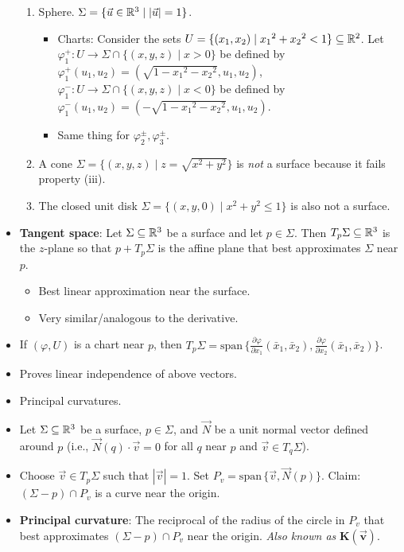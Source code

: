 \documentclass[../apprentice.tex]{subfiles}
\begin{document}
\begin{itemize}
\begin{enumerate}[label={\Alph*)}]
        \item Sphere. $\Sigma=\{\vec{u}\in\mathbb{R}^3\mid|\vec{u}|=1\}$.
        \begin{itemize}
            \item Charts: Consider the sets $U=\{(x_1,x_2)\mid {x_1}^2+{x_2}^2<1\}\subseteq\mathbb{R}^2$. Let $\varphi_1^+:U\to\Sigma\cap\{(x,y,z)\mid x>0\}$ be defined by $\varphi_1^+(u_1,u_2)=(\sqrt{1-{x_1}^2-{x_2}^2},u_1,u_2)$, $\varphi_1^-:U\to\Sigma\cap\{(x,y,z)\mid x<0\}$ be defined by $\varphi_1^-(u_1,u_2)=(-\sqrt{1-{x_1}^2-{x_2}^2},u_1,u_2)$.
            \item Same thing for $\varphi_2^\pm,\varphi_3^\pm$.
        \end{itemize}
        \item A cone $\Sigma=\{(x,y,z)\mid z=\sqrt{x^2+y^2}\}$ is \emph{not} a surface because it fails property (iii).
        \item The closed unit disk $\Sigma=\{(x,y,0)\mid x^2+y^2\leq 1\}$ is also not a surface.
    \end{enumerate}
    \item \textbf{Tangent space}: Let $\Sigma\subseteq\mathbb{R}^3$ be a surface and let $p\in\Sigma$. Then $T_p\Sigma\subseteq\mathbb{R}^3$ is the $z$-plane so that $p+T_p\Sigma$ is the affine plane that best approximates $\Sigma$ near $p$.
    \begin{itemize}
        \item Best linear approximation near the surface.
        \item Very similar/analogous to the derivative.
    \end{itemize}
    \item If $(\varphi,U)$ is a chart near $p$, then $T_p\Sigma=\text{span}\,\{\frac{\partial\varphi}{\partial x_1}(\bar{x}_1,\bar{x}_2),\frac{\partial\varphi}{\partial x_2}(\bar{x}_1,\bar{x}_2)\}$.
    \item Proves linear independence of above vectors.
    \item Principal curvatures.
    \item Let $\Sigma\subseteq\mathbb{R}^3$ be a surface, $p\in\Sigma$, and $\vec{N}$ be a unit normal vector defined around $p$ (i.e., $\vec{N}(q)\cdot\vec{v}=0$ for all $q$ near $p$ and $\vec{v}\in T_q\Sigma$).
    \item Choose $\vec{v}\in T_p\Sigma$ such that $|\vec{v}|=1$. Set $P_v=\text{span}\,\{\vec{v},\vec{N}(p)\}$. Claim: $(\Sigma-p)\cap P_v$ is a curve near the origin.
    \item \textbf{Principal curvature}: The reciprocal of the radius of the circle in $P_v$ that best approximates $(\Sigma-p)\cap P_v$ near the origin. \emph{Also known as} $\bm{K(\vec{v})}$.

\end{itemize}
\end{document}
